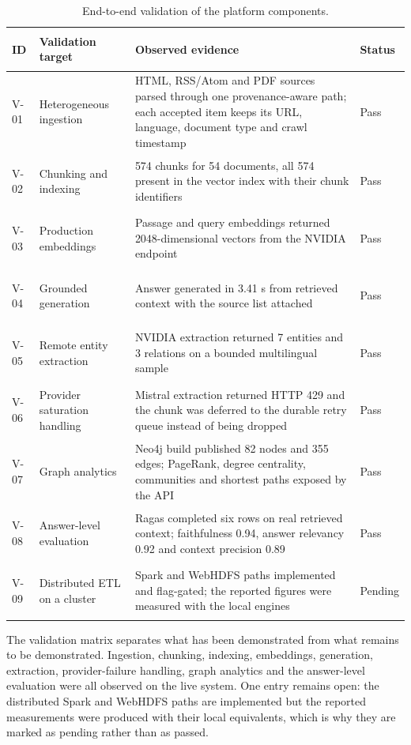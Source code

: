 \begin{table}[H]
\centering
\small
\setlength{\tabcolsep}{5pt}
\renewcommand{\arraystretch}{1.25}
\begin{tabularx}{\textwidth}{@{}>{\bfseries\raggedright\arraybackslash}p{1.5cm}>{\raggedright\arraybackslash}p{4.2cm}X>{\centering\arraybackslash}p{1.7cm}@{}}
\toprule
\rowcolor{lightblue}
\textbf{ID} & \textbf{Validation target} & \textbf{Observed evidence} & \textbf{Status} \\
\midrule
V-01 & Heterogeneous ingestion & HTML, RSS/Atom and PDF sources parsed through one provenance-aware path; each accepted item keeps its URL, language, document type and crawl timestamp & Pass \\
V-02 & Chunking and indexing & 574 chunks for 54 documents, all 574 present in the vector index with their chunk identifiers & Pass \\
V-03 & Production embeddings & Passage and query embeddings returned 2048-dimensional vectors from the NVIDIA endpoint & Pass \\
V-04 & Grounded generation & Answer generated in 3.41 s from retrieved context with the source list attached & Pass \\
V-05 & Remote entity extraction & NVIDIA extraction returned 7 entities and 3 relations on a bounded multilingual sample & Pass \\
V-06 & Provider saturation handling & Mistral extraction returned HTTP 429 and the chunk was deferred to the durable retry queue instead of being dropped & Pass \\
V-07 & Graph analytics & Neo4j build published 82 nodes and 355 edges; PageRank, degree centrality, communities and shortest paths exposed by the API & Pass \\
V-08 & Answer-level evaluation & Ragas completed six rows on real retrieved context; faithfulness 0.94, answer relevancy 0.92 and context precision 0.89 & Pass \\
V-09 & Distributed ETL on a cluster & Spark and WebHDFS paths implemented and flag-gated; the reported figures were measured with the local engines & Pending \\
\bottomrule
\end{tabularx}
\caption{End-to-end validation of the platform components.}
\label{tab:validation}
\end{table}

The validation matrix separates what has been demonstrated from what remains to be demonstrated. Ingestion, chunking, indexing, embeddings, generation, extraction, provider-failure handling, graph analytics and the answer-level evaluation were all observed on the live system. One entry remains open: the distributed Spark and WebHDFS paths are implemented but the reported measurements were produced with their local equivalents, which is why they are marked as pending rather than as passed.

